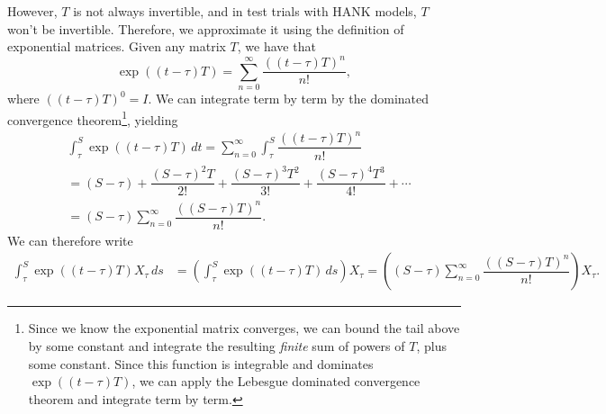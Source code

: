 \documentclass[12 pt, oneside]{article}
\theoremstyle{definition}
\theoremstyle{definition}
\theoremstyle{definition}
\begin{document}
However, $T$ is not always invertible, and in test trials with HANK models, $T$ won't be invertible. Therefore, we approximate it using the definition of exponential matrices. Given any matrix $T$, we have that
\[ \exp((t-\tau) T) = \sum_{n = 0}^\infty \dfrac{((t-\tau)T)^n}{n!}, \]
where $((t-\tau)T)^0 = I$. We can integrate term by term by the dominated convergence theorem\footnote{Since we know the exponential matrix converges, we can bound the tail above by some constant and integrate the resulting \textit{finite} sum of powers of $T$, plus some constant. Since this function is integrable and dominates $\exp((t-\tau)T)$, we can apply the Lebesgue dominated convergence theorem and integrate term by term.}, yielding
\begin{align*}
& \int_{\tau}^S \exp((t-\tau)T)\, dt = \sum_{ n = 0}^\infty \int_\tau^S \dfrac{((t-\tau)T)^n}{n!}\\
& = (S-\tau) +\dfrac{(S-\tau)^2 T}{2!} + \dfrac{(S-\tau)^3T^2}{3!} + \dfrac{(S-\tau)^4T^3}{4!} + \cdots\\
& = (S-\tau)\sum_{n = 0}^\infty \dfrac{((S-\tau)T)^n}{n!}.
\end{align*}
We can therefore write
\begin{align*}
\int_\tau^S \exp((t-\tau)T) X_\tau\, ds & = \left(\int_\tau^S \exp((t-\tau)T)\, ds\right) X_\tau= \left((S-\tau)\sum_{n = 0}^\infty \dfrac{((S-\tau)T)^n}{n!}\right)X_\tau.
\end{align*}
\end{document}
